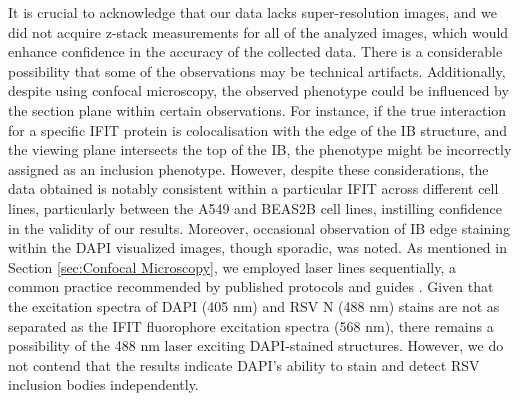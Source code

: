 It is crucial to acknowledge that our data lacks super-resolution images, and we did not acquire z-stack measurements for all of the analyzed images, which would enhance confidence in the accuracy of the collected data. There is a considerable possibility that some of the observations may be technical artifacts. Additionally, despite using confocal microscopy, the observed phenotype could be influenced by the section plane within certain observations. For instance, if the true interaction for a specific IFIT protein is colocalisation with the edge of the IB structure, and the viewing plane intersects the top of the IB, the phenotype might be incorrectly assigned as an inclusion phenotype. However, despite these considerations, the data obtained is notably consistent within a particular IFIT across different cell lines, particularly between the A549 and BEAS2B cell lines, instilling confidence in the validity of our results. Moreover, occasional observation of IB edge staining within the DAPI visualized images, though sporadic, was noted. As mentioned in Section \ref{sec:Confocal Microscopy}, we employed laser lines sequentially, a common practice recommended by published protocols and guides \cite{Jonkman2020Tutorial:Microscopy}. Given that the excitation spectra of DAPI (405 nm) and RSV N (488 nm) stains are not as separated as the IFIT fluorophore excitation spectra (568 nm), there remains a possibility of the 488 nm laser exciting DAPI-stained structures. However, we do not contend that the results indicate DAPI's ability to stain and detect RSV inclusion bodies independently.

